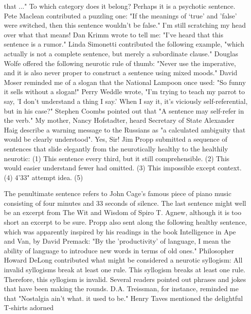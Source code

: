 that ..." To which category does it belong? Perhaps it is a psychotic sentence. Pete Maclean contributed a puzzling one: "If the meanings of `true' and 'false' were switched, then this sentence wouldn't be false." I'm still scratching my head over what that means! Dan Krimm wrote to tell me: "I've heard that this sentence is a rumor." Linda Simonetti contributed the following example, "which actually is not a complete sentence, but merely a subordinate clause." Douglas Wolfe offered the following neurotic rule of thumb: "Never use the imperative, and it is also never proper to construct a sentence using mixed moods." David Moser reminded me of a slogan that the National Lampoon once used: "So funny it sells without a slogan!" Perry Weddle wrote, "I'm trying to teach my parrot to say, 'I don't understand a thing I say.' When I say it, it's viciously self-referential, but in his case?" Stephen Coombs pointed out that "A sentence may self-refer in the verb." My mother, Nancy Hofstadter, heard Secretary of State Alexander Haig describe a warning message to the Russians as "a calculated ambiguity that would be clearly understood". Yes, Sir! Jim Propp submitted a sequence of sentences that slide elegantly from the neurotically healthy to the healthily neurotic: 
(1) This sentence every third, but it still comprehensible. (2) This would easier understand fewer had omitted. (3) This impossible except context. (4) 4'33" attempt idea. \intro (5) \endintro

The penultimate sentence refers to John Cage's famous piece of piano music consisting of four minutes and 33 seconds of silence. The last sentence might well be an excerpt from The Wit and Wisdom of Spiro T. Agnew, although it is too short an excerpt to be sure. Propp also sent along the following healthy sentence, which was apparently inspired by his readings in the book Intelligence in Ape and Van, by David Premack: "By the 'productivity' of language, I mean the ability of language to introduce new words in terms of old ones." Philosopher Howard DeLong contributed what might be considered a neurotic syllogism: 
All invalid syllogisms break at least one rule. This syllogism breaks at least one rule. Therefore, this syllogism is invalid. 
Several readers pointed out phrases and jokes that have been making the rounds. D.A. Treissman, for instance, reminded me that "Nostalgia ain't what. it used to be." Henry Taves mentioned the delightful T-shirts adorned 



